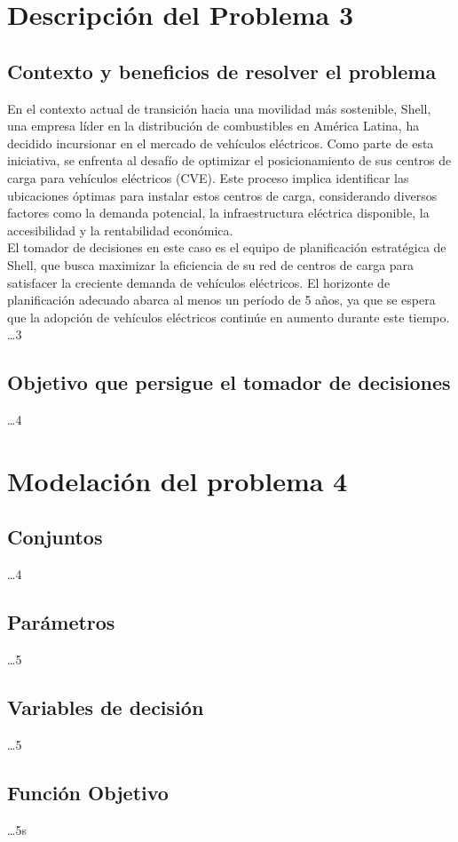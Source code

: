 \documentclass[letterpaper]{article}
\begin{document}
\newpage
\begin{flushleft}
\section{Descripción del Problema 3}
\subsection{Contexto y beneficios de resolver el problema}
En el contexto actual de transición hacia una movilidad más sostenible, Shell, una empresa líder en la distribución de combustibles en América Latina, ha decidido incursionar en el mercado de vehículos eléctricos. Como parte de esta iniciativa, se enfrenta al desafío de optimizar el posicionamiento de sus centros de carga para vehículos eléctricos (CVE). Este proceso implica identificar las ubicaciones óptimas para instalar estos centros de carga, considerando diversos factores como la demanda potencial, la infraestructura eléctrica disponible, la accesibilidad y la rentabilidad económica. 
\\
El tomador de decisiones en este caso es el equipo de planificación estratégica de Shell, que busca maximizar la eficiencia de su red de centros de carga para satisfacer la creciente demanda de vehículos eléctricos. El horizonte de planificación adecuado abarca al menos un período de 5 años, ya que se espera que la adopción de vehículos eléctricos continúe en aumento durante este tiempo.  \dots 3
\subsection{Objetivo que persigue el tomador de decisiones} \dots 4

\section{Modelación del problema 4}
\subsection{Conjuntos} \dots 4
\subsection{Parámetros} \dots 5
\subsection{Variables de decisión} \dots 5
\subsection{Función Objetivo} \dots 5s

\end{flushleft}
\end{document}

